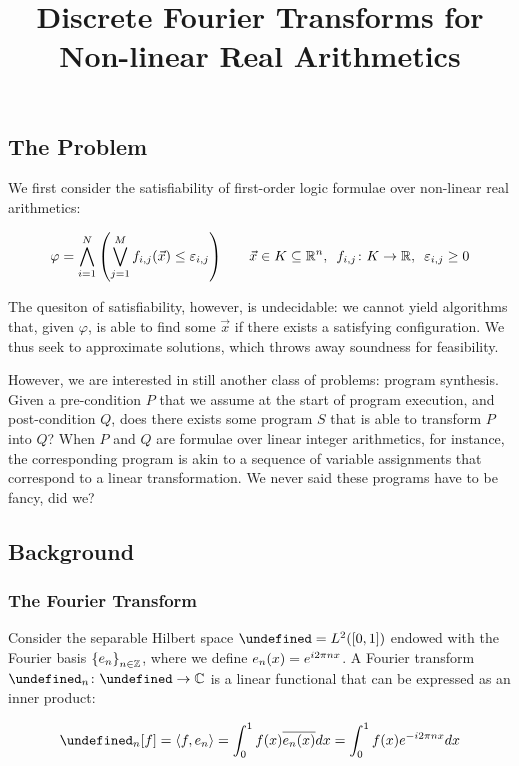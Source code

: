 \documentclass[12pt]{article}
\author{}
\title{Discrete Fourier Transforms for Non-linear Real Arithmetics}
\date{}
\let\H\undefined
\newcommand{\H}{\mathcal{H}}
\let\F\undefined
\newcommand{\F}{\mathcal{F}}
\begin{document}
\maketitle

\subsection{The Problem}
We first consider the satisfiability of first-order logic formulae over
non-linear real arithmetics:

\begin{align*}
  \varphi
    = \bigwedge_{i = 1}^{N} {\left(\bigvee_{j = 1}^{M}
        f_{i, j}{\left(\vec{x}\right)} \leq \varepsilon_{i, j}\right)}
  \qquad
  \vec{x} \in K \subseteq {\mathbb{R}}^n, \enskip
  {f_{i, j} \colon K \to {\mathbb{R}}}, \enskip
  \varepsilon_{i, j} \geq 0
\end{align*}

The quesiton of satisfiability, however, is undecidable:
we cannot yield algorithms that, given $\varphi$, is able to find some
$\vec{x}$ if there exists a satisfying configuration.
We thus seek to approximate solutions, which throws away soundness for
feasibility.

However, we are interested in still another class of problems:
program synthesis.
Given a pre-condition $P$ that we assume at the start of program execution,
and post-condition $Q$, does there exists some program $S$ that is able to
transform $P$ into $Q$?
When $P$ and $Q$ are formulae over linear integer arithmetics, for instance,
the corresponding program is akin to a sequence of variable assignments
that correspond to a linear transformation.
We never said these programs have to be fancy, did we?


\subsection{Background}
\subsubsection*{The Fourier Transform}
Consider the separable Hilbert space $\H = L^2 \parens{\brackets{0, 1}}$
endowed with the Fourier basis ${\left\{e_n\right\}}_{n \in {\mathbb{Z}}}$, where we define
$e_n {\left(x\right)} = e^{i 2\pi n x}$.
A Fourier transform $\type{\F_n}{\H}{\C}$ is a linear functional that can
be expressed as an inner product:

\begin{align*}
  \F_n\brackets{f}
    = \inner{f, e_n}
    = \int_0^1 f\parens{x} \overline{e_n \parens{x}} dx
    = \int_0^1 f\parens{x} e^{-i 2 \pi n x} dx
\end{align*}
\end{document}
